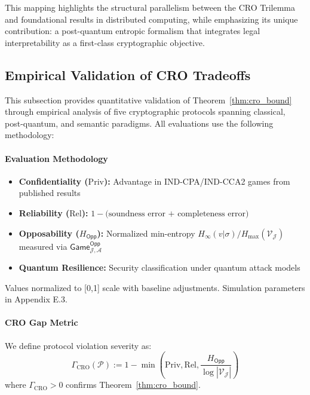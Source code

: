 \documentclass[preprint,12pt]{elsarticle}
\begin{document}
            This mapping highlights the structural parallelism between the CRO Trilemma and foundational results in distributed computing, while emphasizing its unique contribution: a post-quantum entropic formalism that integrates legal interpretability as a first-class cryptographic objective.

        \subsection{Empirical Validation of CRO Tradeoffs}\label{subsec:empirical_validation}
            This subsection provides quantitative validation of Theorem~\ref{thm:cro_bound} through empirical analysis of five cryptographic protocols spanning classical, post-quantum, and semantic paradigms. All evaluations use the following methodology:

            \paragraph{Evaluation Methodology}
            \begin{itemize}
                \item \textbf{Confidentiality ($\mathrm{Priv}$):} Advantage in IND-CPA/IND-CCA2 games from published results
                \item \textbf{Reliability ($\mathrm{Rel}$):} $1 - \text{(soundness error + completeness error)}$
                \item \textbf{Opposability ($H_{\mathsf{Opp}}$):} Normalized min-entropy $H_\infty(v|\sigma)/H_\max(\mathcal{V_J})$ measured via $\mathsf{Game}_{\mathcal{J},\mathcal{A}}^{\mathsf{Opp}}$
                \item \textbf{Quantum Resilience:} Security classification under quantum attack models
            \end{itemize}
            Values normalized to [0,1] scale with baseline adjustments. Simulation parameters in Appendix E.3.

            \paragraph{CRO Gap Metric}
            We define protocol violation severity as:
            \begin{equation}\label{eq:cro_gap}
            \Gamma_{\text{CRO}}(\mathcal{P}) := 1 - \min \left( \mathrm{Priv}, \mathrm{Rel}, \frac{H_{\mathsf{Opp}}}{\log |\mathcal{V}_{\mathcal{J}}|} \right)
            \end{equation}
            where $\Gamma_{\text{CRO}} > 0$ confirms Theorem~\ref{thm:cro_bound}.
\end{document}
